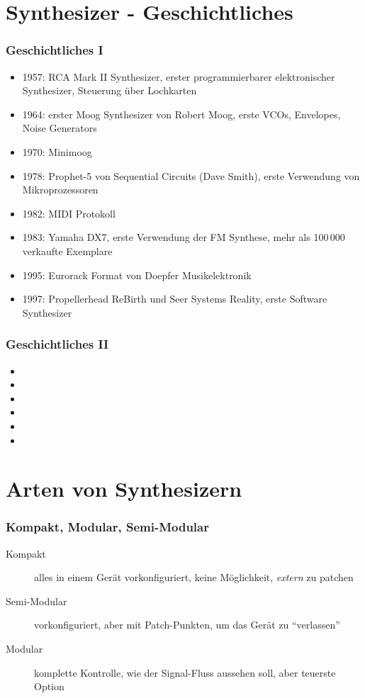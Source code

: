 \documentclass[11pt,ngerman]{beamer}
\begin{document}

 
\section{Synthesizer - Geschichtliches}

\begin{frame}
\frametitle{Geschichtliches I}


\begin{itemize}
\item 1957: RCA Mark II Synthesizer, erster programmierbarer elektronischer Synthesizer, Steuerung über Lochkarten 
\item 1964: erster Moog Synthesizer von Robert Moog, erste VCOs, Envelopes, Noise Generators
\item 1970: Minimoog
\item 1978: Prophet-5 von Sequential Circuits (Dave Smith), erste Verwendung von Mikroprozessoren
\item 1982: MIDI Protokoll
\item 1983: Yamaha DX7, erste Verwendung der FM Synthese, mehr als 100\,000 verkaufte Exemplare
\item 1995: Eurorack Format von Doepfer Musikelektronik
\item 1997: Propellerhead ReBirth und Seer Systems Reality, erste Software Synthesizer
\end{itemize}
\end{frame} 
 
\begin{frame}
\frametitle{Geschichtliches II}


\begin{itemize}
\item 
\item 
\item 
\item 
\item 
\item 
\end{itemize}
\end{frame}
 
 
\section{Arten von Synthesizern}
 
\begin{frame}
\frametitle{Kompakt, Modular, Semi-Modular}

\begin{description}
\item [Kompakt] alles in einem Gerät vorkonfiguriert, keine Möglichkeit, \textit{extern} zu patchen
\item [Semi-Modular] vorkonfiguriert, aber mit Patch-Punkten, um das Gerät zu \enquote{verlassen}
\item [Modular] komplette Kontrolle, wie der Signal-Fluss aussehen soll, aber teuerste Option
\end{description}
\end{frame}
\end{document}
